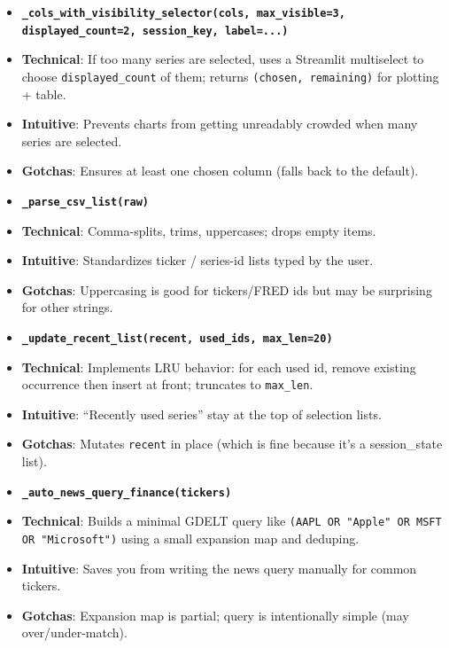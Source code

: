 \documentclass[11pt]{article}
\begin{document}
\begin{itemize}[leftmargin=*,nosep]
\item \textbf{\texttt{\_cols\_with\_visibility\_selector(cols, max\_visible=3, displayed\_count=2, session\_key, label=...)}}
\item \textbf{Technical}: If too many series are selected, uses a Streamlit multiselect to choose \texttt{displayed\_count} of them; returns \texttt{(chosen, remaining)} for plotting + table.
\item \textbf{Intuitive}: Prevents charts from getting unreadably crowded when many series are selected.
\item \textbf{Gotchas}: Ensures at least one chosen column (falls back to the default).
\end{itemize}


\begin{itemize}[leftmargin=*,nosep]
\item \textbf{\texttt{\_parse\_csv\_list(raw)}}
\item \textbf{Technical}: Comma-splits, trims, uppercases; drops empty items.
\item \textbf{Intuitive}: Standardizes ticker / series-id lists typed by the user.
\item \textbf{Gotchas}: Uppercasing is good for tickers/FRED ids but may be surprising for other strings.
\end{itemize}


\begin{itemize}[leftmargin=*,nosep]
\item \textbf{\texttt{\_update\_recent\_list(recent, used\_ids, max\_len=20)}}
\item \textbf{Technical}: Implements LRU behavior: for each used id, remove existing occurrence then insert at front; truncates to \texttt{max\_len}.
\item \textbf{Intuitive}: “Recently used series” stay at the top of selection lists.
\item \textbf{Gotchas}: Mutates \texttt{recent} in place (which is fine because it’s a session\_state list).
\end{itemize}


\begin{itemize}[leftmargin=*,nosep]
\item \textbf{\texttt{\_auto\_news\_query\_finance(tickers)}}
\item \textbf{Technical}: Builds a minimal GDELT query like \texttt{(AAPL OR "Apple" OR MSFT OR "Microsoft")} using a small expansion map and deduping.
\item \textbf{Intuitive}: Saves you from writing the news query manually for common tickers.
\item \textbf{Gotchas}: Expansion map is partial; query is intentionally simple (may over/under-match).
\end{itemize}
\end{document}
